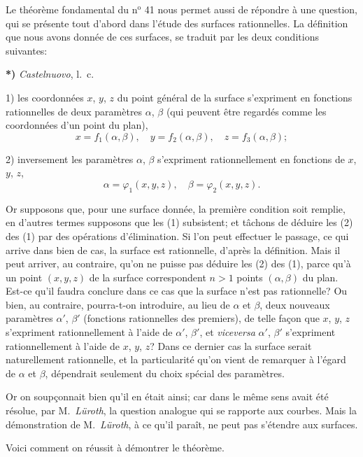 \documentclass{article}
\begin{document}
Le théorème fondamental du n${}^{\text{o}}$ 41 nous permet aussi de répondre à une question, qui se présente tout d'abord dans l'étude des surfaces rationnelles. La définition que nous avons donnée de ces surfaces, se traduit par les deux conditions suivantes:

\textbf{*)} \emph{Castelnuovo}, l.\ c.


1) les coordonnées $x$, $y$, $z$ du point général de la surface s'expriment en fonctions rationnelles de deux paramètres $\alpha$, $\beta$ (qui peuvent être regardés comme les coordonnées d'un point du plan),
\[ x = f_{1}(\alpha, \beta), \quad y = f_{2}(\alpha, \beta), \quad z = f_{3}(\alpha, \beta); \tag{1} \]

2) inversement les paramètres $\alpha$, $\beta$ s'expriment rationnellement en fonctions de $x$, $y$, $z$,
\[ \alpha = \varphi_{1}(x, y, z), \quad \beta = \varphi_{2}(x, y, z). \tag{2} \]

Or supposons que, pour une surface donnée, la première condition soit remplie, en d'autres termes supposons que les (1) subsistent; et tâchons de déduire les (2) des (1) par des opérations d'élimination. Si l'on peut effectuer le passage, ce qui arrive dans bien de cas, la surface est rationnelle, d'après la définition. Mais il peut arriver, au contraire, qu'on ne puisse pas déduire les (2) des (1), parce qu'à un point $(x, y, z)$ de la surface correspondent $n > 1$ points $(\alpha, \beta)$ du plan. Est-ce qu'il faudra conclure dans ce cas que la surface n'est pas rationnelle? Ou bien, au contraire, pourra-t-on introduire, au lieu de $\alpha$ et $\beta$, deux nouveaux paramètres $\alpha'$, $\beta'$ (fonctions rationnelles des premiers), de telle façon que $x$, $y$, $z$ s'expriment rationnellement à l'aide de $\alpha'$, $\beta'$, et \emph{viceversa} $\alpha'$, $\beta'$ s'expriment rationnellement à l'aide de $x$, $y$, $z$? Dans ce dernier cas la surface serait naturellement rationnelle, et la particularité qu'on vient de remarquer à l'égard de $\alpha$ et $\beta$, dépendrait seulement du choix spécial des paramètres.

Or on soupçonnait bien qu'il en était ainsi; car dans le même sens avait été résolue, par M.\ \emph{Lüroth}, la question analogue qui se rapporte aux courbes. Mais la démonstration de M.\ \emph{Lüroth}, à ce qu'il paraît, ne peut pas s'étendre aux surfaces.

Voici comment on réussit à démontrer le théorème.
\end{document}
